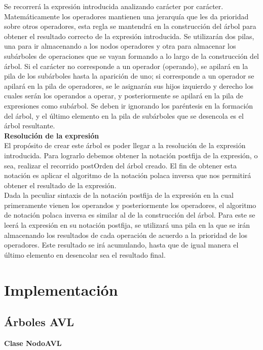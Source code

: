 \documentclass{article}
\begin{document}
Se recorrerá la expresión introducida analizando carácter por carácter. Matemáticamente los operadores mantienen una jerarquía que les da prioridad sobre otros operadores, esta regla se mantendrá en la construcción del árbol para obtener el resultado correcto de la expresión introducida. Se utilizarán dos pilas, una para ir almacenando a los nodos operadores y otra para almacenar los subárboles de operaciones que se vayan formando a lo largo de la construcción del árbol. Si el carácter no corresponde a un operador (operando), se apilará en la pila de los subárboles hasta la aparición de uno; si corresponde a un operador se apilará en la pila de operadores, se le asignarán sus hijos izquierdo y derecho los cuales serán los operandos a operar, y posteriormente se apilará en la pila de expresiones como subárbol. Se deben ir ignorando los paréntesis en la formación del árbol, y el último elemento en la pila de subárboles que se desencola es el árbol resultante.\\

\textbf{Resolución de la expresión}\\

El propósito de crear este árbol es poder llegar a la resolución de la expresión introducida. Para lograrlo debemos obtener la notación postfija de la expresión, o sea, realizar el recorrido postOrden del árbol creado. El fin de obtener esta notación es aplicar el algoritmo de la notación polaca inversa que nos permitirá obtener el resultado de la expresión. \\

Dada la peculiar sintaxis de la notación postfija de la expresión en la cual primeramente vienen los operandos y posteriormente los operadores, el algoritmo de notación polaca inversa es similar al de la construcción del árbol. Para este se leerá la expresión en su notación postfija, se utilizará una pila en la que se irán almacenando los resultados de cada operación de acuerdo a la prioridad de los operadores. Este resultado se irá acumulando, hasta que de igual manera el último elemento en desencolar sea el resultado final.

\newpage
\section{Implementación}

\subsection{Árboles AVL}
\vspace{5mm} %
\textbf{Clase NodoAVL}\\
\end{document}
